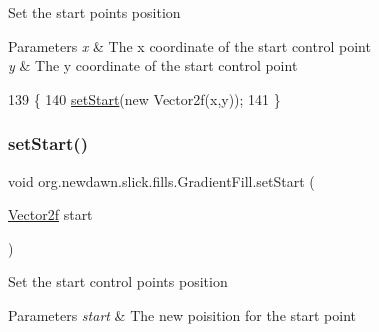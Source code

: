 Set the start point\textquotesingle{}s position


\begin{DoxyParams}{Parameters}
{\em x} & The x coordinate of the start control point \\
\hline
{\em y} & The y coordinate of the start control point \\
\hline
\end{DoxyParams}

\begin{DoxyCode}
139                                            \{
140         \mbox{\hyperlink{classorg_1_1newdawn_1_1slick_1_1fills_1_1_gradient_fill_af1e31068e19c4694dc6db73af7576246}{setStart}}(\textcolor{keyword}{new} Vector2f(x,y));
141     \}
\end{DoxyCode}
\mbox{\label{classorg_1_1newdawn_1_1slick_1_1fills_1_1_gradient_fill_aa4a99cbace5ecd55970ab5aac4a44a1c}} 
\subsubsection{\texorpdfstring{set\+Start()}{setStart()}\hspace{0.1cm}{\footnotesize\ttfamily [2/2]}}
{\footnotesize\ttfamily void org.\+newdawn.\+slick.\+fills.\+Gradient\+Fill.\+set\+Start (\begin{DoxyParamCaption}\item[{\mbox{\hyperlink{classorg_1_1newdawn_1_1slick_1_1geom_1_1_vector2f}{Vector2f}}}]{start }\end{DoxyParamCaption})\hspace{0.3cm}{\ttfamily [inline]}}

Set the start control point\textquotesingle{}s position


\begin{DoxyParams}{Parameters}
{\em start} & The new poisition for the start point \\
\hline
\end{DoxyParams}


